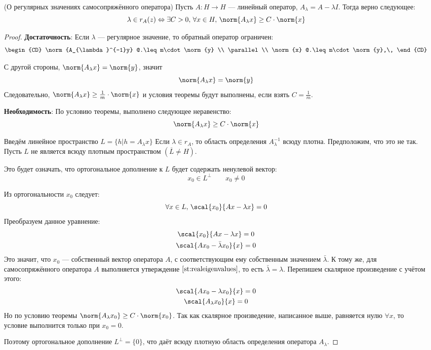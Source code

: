 	\begin{theorem}
		(О регулярных значениях самосопряжённого оператора) Пусть $A: H \rightarrow H$ --- линейный оператор, 
		$A_{\lambda} = A - \lambda I$. Тогда верно следующее:
		$$\lambda \in r_{A}(z) \Leftrightarrow \exists C > 0,\, \forall x \in H,\, \norm{A_{\lambda}x} \geq C\cdot\norm{x}$$
	\end{theorem}
	\begin{proof}
		\textbf{Достаточность}: 
		Если $\lambda$ --- регулярное значение, то обратный оператор ограничен:
		$$
		\begin{CD}
			\norm{A_{\lambda}^{-1}y} @.\leq m\cdot\norm{y} \\
			\parallel \\		
			\norm{x} @.\leq m\cdot\norm{y},\,
		\end{CD}
		$$
		
		С другой стороны, $\norm{A_{\lambda}x} = \norm{y}$, значит
		$$\norm{A_{\lambda}x} = \norm{y}$$
		Следовательно, $\norm{A_{\lambda}x}\geq\frac{1}{m}\cdot\norm{x}$ и условия теоремы будут выполнены, если взять
		$C = \frac{1}{m}$.
		
		\textbf{Необходимость}: 
		По условию теоремы, выполнено следующее неравенство:
		$$\norm{A_{\lambda}x} \geq C\cdot\norm{x}$$
		
		Введём линейное пространство $L = \{ h|h=A_{\lambda}x\}$ Если $\lambda \in r_A$, то область определения
		$A_{\lambda}^{-1}$ всюду плотна. Предположим, что это не так. Пусть $L$ не 
		является всюду плотным пространством $\left(\overline{L}\neq H\right)$.
		
		Это будет означать, что ортогональное дополнение к $L$ будет содержать ненулевой вектор:
		$$x_0 \in L^{\perp} \qquad x_0 \neq 0$$
		
		Из ортогональности $x_0$ следует:
		$$\forall x\in L,\, \scal{x_0}{Ax - \lambda x} = 0$$
		Преобразуем данное уравнение:
		\begin{gather*}
			\scal{x_0}{Ax - \lambda x} = 0 \\
			\scal{Ax_0 - \bar{\lambda} x_0}{x} = 0 \\
		\end{gather*}
		Это значит, что $x_0$ --- собственный вектор оператора $A$, с соответствующим ему собственным значением $\bar{\lambda}$.
		К тому же, для самосопряжённого оператора $A$ выполняется утверждение $\ref{st:realeigenvalues}$, то есть 
		$\bar{\lambda} = \lambda$. Перепишем скалярное произведение с учётом этого:
		\begin{gather*}
			\scal{Ax_0 - \lambda x_0}{x} = 0 \\
			\scal{A_{\lambda} x_0}{x} = 0
		\end{gather*}
		Но по условию теоремы $\norm{A_{\lambda}x_0} \geq C\cdot\norm{x_0}$. Так как скалярное произведение, 
		написанное выше, равняется нулю $\forall x$, то условие выполнится только при $x_0 = 0$. 
		
		Поэтому ортогональное дополнение $L^{\perp} = \{0\}$, что даёт всюду плотную область определения оператора $A_{\lambda}$.
	\end{proof}
	
